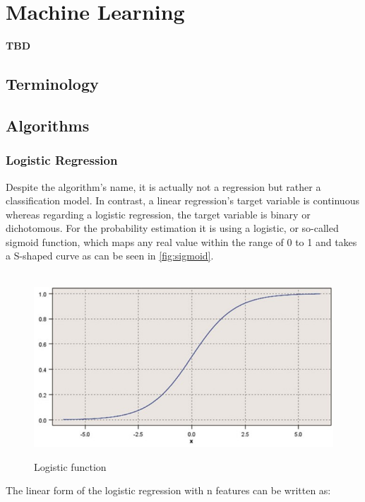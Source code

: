 \chapter{Machine Learning}
\label{chap:three}

\textbf{TBD}

\section{Terminology}
\section{Algorithms}
\subsection{Logistic Regression}

Despite the algorithm's name, it is actually not a regression but rather a classification model.
In contrast, a linear regression's target variable is continuous whereas regarding a logistic regression, the target variable is binary or dichotomous.
For the probability estimation it is using a logistic, or so-called sigmoid function, which maps any real value within the range of 0 to 1 and takes a S-shaped curve as can be seen in \autoref{fig:sigmoid}.

\begin{figure}[H]
    \centering
    \caption{Logistic function}\vspace{0.5em}
    \label{fig:sigmoid}\
    \includegraphics[width=130mm]{Figures/sigmoid.jpg}
    \vspace{-1em}
\end{figure}

The linear form of the logistic regression with n features can be written as:

